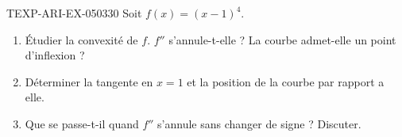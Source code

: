 \begin{exercice}{TEXP-ARI-EX-050}{3}{30}
Soit $f(x) = (x-1)^4$.
\begin{enumerate}
  \item Étudier la convexité de $f$. $f''$ s'annule-t-elle ? La courbe admet-elle un point d'inflexion ?
  \item Déterminer la tangente en $x = 1$ et la position de la courbe par rapport a elle.
  \item Que se passe-t-il quand $f''$ s'annule sans changer de signe ? Discuter.
\end{enumerate}

\end{exercice}

